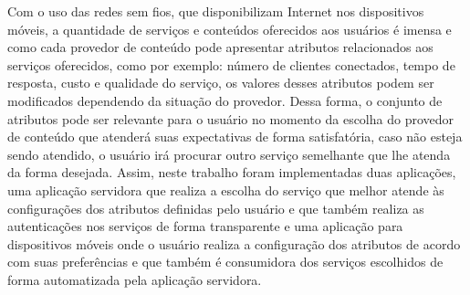 \begin{resumo}
Com o uso das redes sem fios, que disponibilizam Internet nos dispositivos móveis, a quantidade de serviços e conteúdos oferecidos aos usuários é imensa e como cada provedor de conteúdo pode apresentar atributos relacionados aos serviços oferecidos, como por exemplo: número de clientes conectados, tempo de resposta, custo e qualidade do serviço, os valores desses atributos podem ser modificados dependendo da situação do provedor. Dessa forma, o conjunto de atributos pode ser relevante para o usuário no momento da escolha do provedor de conteúdo que atenderá suas expectativas de forma satisfatória, caso não esteja sendo atendido, o usuário irá procurar outro serviço semelhante que lhe atenda da forma desejada. Assim, neste trabalho foram implementadas duas aplicações, uma aplicação servidora que realiza a escolha do serviço que melhor atende às configurações dos atributos definidas pelo usuário e que também realiza as autenticações nos serviços de forma transparente e uma aplicação para dispositivos móveis onde o usuário realiza a configuração dos atributos de acordo com suas preferências e que também é consumidora dos serviços escolhidos de forma automatizada pela aplicação servidora.
\end{resumo}	
